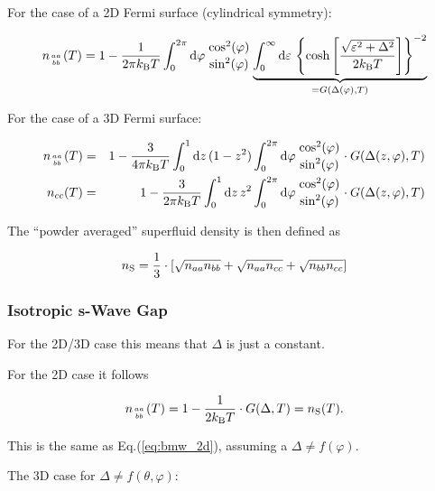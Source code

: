 \documentclass[twoside]{article}
\begin{document}
\noindent For the case of a 2D Fermi surface (cylindrical symmetry):

\begin{equation}\label{eq:n_anisotrope_2D}
n_{aa \atop bb}(T) = 1 - \frac{1}{2\pi k_{\rm B} T} \int_0^{2\pi} \mathrm{d}\varphi\, {\cos^2(\varphi) \atop \sin^2(\varphi)} \underbrace{\int_0^\infty \mathrm{d}\varepsilon\, \left\{ \cosh\left[\frac{\sqrt{\varepsilon^2 + \Delta^2}}{2 k_{\rm B}T}\right]\right\}^{-2}}_{= G(\Delta(\varphi), T)}
\end{equation}

\noindent For the case of a 3D Fermi surface:

\begin{eqnarray}
 n_{aa \atop bb}(T) &=& 1 - \frac{3}{4\pi k_{\rm B} T} \int_0^1 \mathrm{d}z\, (1-z^2) \int_0^{2\pi} \mathrm{d}\varphi\, {\cos^2(\varphi) \atop \sin^2(\varphi)} \cdot G(\Delta(z,\varphi), T) \label{eq:n_anisotrope_3D_aabb} \\
 n_{cc}(T) &=& 1 - \frac{3}{2\pi k_{\rm B} T} \int_0^1 \mathrm{d}z\, z^2 \int_0^{2\pi} \mathrm{d}\varphi\, {\cos^2(\varphi) \atop \sin^2(\varphi)} \cdot G(\Delta(z,\varphi), T) \label{eq:n_anisotrope_3D_cc}
\end{eqnarray}

\noindent The ``powder averaged'' superfluid density is then defined as

\begin{equation}
 n_{\rm S} = \frac{1}{3}\cdot \left[ \sqrt{n_{aa} n_{bb}} + \sqrt{n_{aa} n_{cc}} + \sqrt{n_{bb} n_{cc}} \right]
\end{equation}

\subsubsection*{Isotropic s-Wave Gap}

\noindent For the 2D/3D case this means that $\Delta$ is just a constant. 

\noindent For the 2D case it follows

\begin{equation}
  n_{aa \atop bb}(T) = 1 - \frac{1}{2 k_{\rm B} T} \cdot G(\Delta, T) = n_{\rm S}(T).
\end{equation}

\noindent This is the same as Eq.(\ref{eq:bmw_2d}), assuming a $\Delta \neq f(\varphi)$.

\vspace{5mm}

\noindent The 3D case for $\Delta \neq f(\theta, \varphi)$:
\end{document}
